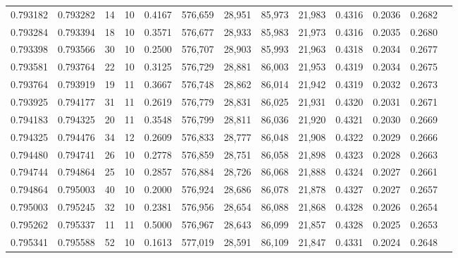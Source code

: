 \begin{tabular}{rrrrrrrrrrrrr}
0.793182 & 0.793282 &    14 &  10 &                                     0.4167 & 576,659 &  28,951 &  85,973 &  21,983 & 0.4316 & 0.2036 & 0.2682 \\
0.793284 & 0.793394 &    18 &  10 &                                     0.3571 & 576,677 &  28,933 &  85,983 &  21,973 & 0.4316 & 0.2035 & 0.2680 \\
0.793398 & 0.793566 &    30 &  10 &                                     0.2500 & 576,707 &  28,903 &  85,993 &  21,963 & 0.4318 & 0.2034 & 0.2677 \\
0.793581 & 0.793764 &    22 &  10 &                                     0.3125 & 576,729 &  28,881 &  86,003 &  21,953 & 0.4319 & 0.2034 & 0.2675 \\
0.793764 & 0.793919 &    19 &  11 &                                     0.3667 & 576,748 &  28,862 &  86,014 &  21,942 & 0.4319 & 0.2032 & 0.2673 \\
0.793925 & 0.794177 &    31 &  11 &                                     0.2619 & 576,779 &  28,831 &  86,025 &  21,931 & 0.4320 & 0.2031 & 0.2671 \\
0.794183 & 0.794325 &    20 &  11 &                                     0.3548 & 576,799 &  28,811 &  86,036 &  21,920 & 0.4321 & 0.2030 & 0.2669 \\
0.794325 & 0.794476 &    34 &  12 &                                     0.2609 & 576,833 &  28,777 &  86,048 &  21,908 & 0.4322 & 0.2029 & 0.2666 \\
0.794480 & 0.794741 &    26 &  10 &                                     0.2778 & 576,859 &  28,751 &  86,058 &  21,898 & 0.4323 & 0.2028 & 0.2663 \\
0.794744 & 0.794864 &    25 &  10 &                                     0.2857 & 576,884 &  28,726 &  86,068 &  21,888 & 0.4324 & 0.2027 & 0.2661 \\
0.794864 & 0.795003 &    40 &  10 &                                     0.2000 & 576,924 &  28,686 &  86,078 &  21,878 & 0.4327 & 0.2027 & 0.2657 \\
0.795003 & 0.795245 &    32 &  10 &                                     0.2381 & 576,956 &  28,654 &  86,088 &  21,868 & 0.4328 & 0.2026 & 0.2654 \\
0.795262 & 0.795337 &    11 &  11 &                                     0.5000 & 576,967 &  28,643 &  86,099 &  21,857 & 0.4328 & 0.2025 & 0.2653 \\
0.795341 & 0.795588 &    52 &  10 &                                     0.1613 & 577,019 &  28,591 &  86,109 &  21,847 & 0.4331 & 0.2024 & 0.2648 \\

\end{tabular}
